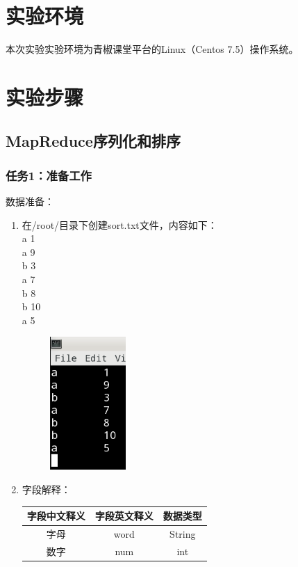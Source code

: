 \documentclass {article}
\begin{document}
	\section{实验环境}
		本次实验实验环境为青椒课堂平台的Linux（Centos 7.5）操作系统。
	
	\section{实验步骤}
		\subsection{MapReduce序列化和排序}
			\subsubsection{任务1：准备工作}
				数据准备：
				\begin{enumerate}
					\item 在/root/目录下创建sort.txt文件，内容如下：\\
					a	1 \\
					a	9 \\
					b	3 \\
					a	7 \\
					b	8 \\
					b	10 \\
					a	5
					
					\begin{figure}[H]
						\centering
						\includegraphics{figures/fig1.png}
					\end{figure}
				
					\item 字段解释：
					\begin{table}[H]
						\centering
						\begin{tabular}{|c|c|c|}
							\hline
							字段中文释义 & 字段英文释义 & 数据类型 \\ \hline
							字母 & word & String \\
							数字 & num & int \\ 
							\hline
						\end{tabular}
					\end{table}
				\end{enumerate}
			
\end{document}
